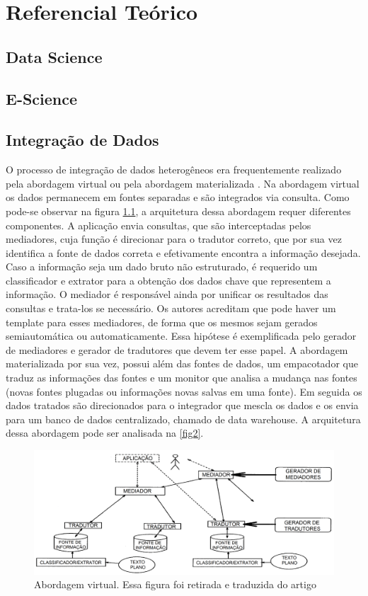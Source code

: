 \chapter{Referencial Teórico}

\section{Data Science}
\section{E-Science}

\section{Integração de Dados}
O processo de integração de dados heterogêneos era frequentemente realizado pela abordagem virtual \cite{chawathe1994tsimmis} ou pela abordagem materializada \cite{Widom:1995:RPD:221270.221319}.
Na abordagem virtual os dados permanecem em fontes separadas e são integrados via consulta. Como pode-se observar na figura \ref{fig1}, a arquitetura dessa abordagem requer diferentes componentes. A aplicação envia consultas, que são interceptadas pelos mediadores, cuja função é direcionar para o tradutor correto, que por sua vez identifica a fonte de dados correta e efetivamente encontra a informação desejada. Caso a informação seja um dado bruto não estruturado, é requerido um classificador e extrator para a obtenção dos dados chave que representem a informação. O mediador é responsável ainda por unificar os resultados das consultas e trata-los se necessário. Os autores acreditam que pode haver um template para esses mediadores, de forma que os mesmos sejam gerados semiautomática ou automaticamente. Essa hipótese é exemplificada pelo gerador de mediadores e gerador de tradutores que devem ter esse papel.
A abordagem materializada por sua vez, possui além das fontes de dados, um empacotador que traduz as informações das fontes e um monitor que analisa a mudança nas fontes (novas fontes plugadas ou informações novas salvas em uma fonte). Em seguida os dados tratados são direcionados para o integrador que mescla os dados e os envia para um banco de dados centralizado, chamado de  data warehouse. A arquitetura dessa abordagem pode ser analisada na \ref{fig2}.


\begin{figure}[!ht]
\centering
\includegraphics[width=0.3\linewidth]{figuras/TSIMMIS.png}
\caption{Abordagem virtual. Essa figura foi retirada e traduzida do artigo \cite{chawathe1994tsimmis}}
\label{fig1}
\end{figure}

